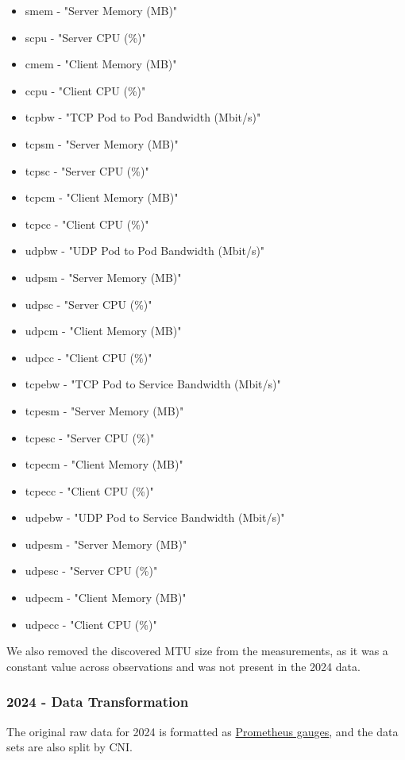 \begin{itemize}
    \item smem - "Server Memory (MB)"
    \item scpu - "Server CPU (\%)"
    \item cmem - "Client Memory (MB)"
    \item ccpu - "Client CPU (\%)"
    \item tcpbw - "TCP Pod to Pod Bandwidth (Mbit/s)"
    \item tcpsm - "Server Memory (MB)"
    \item tcpsc - "Server CPU (\%)"
    \item tcpcm - "Client Memory (MB)"
    \item tcpcc - "Client CPU (\%)"
    \item udpbw - "UDP Pod to Pod Bandwidth (Mbit/s)"
    \item udpsm - "Server Memory (MB)"
    \item udpsc - "Server CPU (\%)"
    \item udpcm - "Client Memory (MB)"
    \item udpcc - "Client CPU (\%)"
    \item tcpebw - "TCP Pod to Service Bandwidth (Mbit/s)"
    \item tcpesm - "Server Memory (MB)"
    \item tcpesc - "Server CPU (\%)"
    \item tcpecm - "Client Memory (MB)"
    \item tcpecc - "Client CPU (\%)"
    \item udpebw - "UDP Pod to Service Bandwidth (Mbit/s)"
    \item udpesm - "Server Memory (MB)"
    \item udpesc - "Server CPU (\%)"
    \item udpecm - "Client Memory (MB)"
    \item udpecc - "Client CPU (\%)"
\end{itemize}

We also removed the discovered MTU size from the measurements, as it was a constant value across observations and was not present in the 2024 data.

\subsubsection{2024 - Data Transformation}

The original raw data for 2024 is formatted as \href{https://prometheus.io/docs/concepts/metric_types/#gauge}{Prometheus gauges}, and the data sets are also split by CNI.

